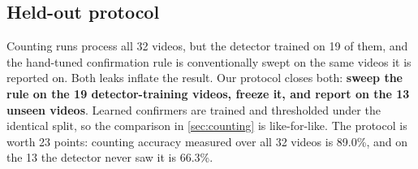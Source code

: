 \subsection{Held-out protocol}
\label{sec:heldout}

Counting runs process all 32 videos, but the detector trained on 19 of them, and the
hand-tuned confirmation rule is conventionally swept on the same videos it is reported on.
Both leaks inflate the result. Our protocol closes both: \textbf{sweep the rule on the 19
detector-training videos, freeze it, and report on the 13 unseen videos}. Learned
confirmers are trained and thresholded under the identical split, so the comparison in
\cref{sec:counting} is like-for-like. The protocol is worth 23 points: counting accuracy
measured over all 32 videos is 89.0\%, and on the 13 the detector never saw it is 66.3\%.
